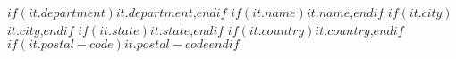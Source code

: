 $if(it.department)$$it.department$,$endif$ $if(it.name)$$it.name$,$endif$ $if(it.city)$$it.city$,$endif$  $if(it.state)$$it.state$,$endif$ $if(it.country)$$it.country$,$endif$ $if(it.postal-code)$$it.postal-code$$endif$